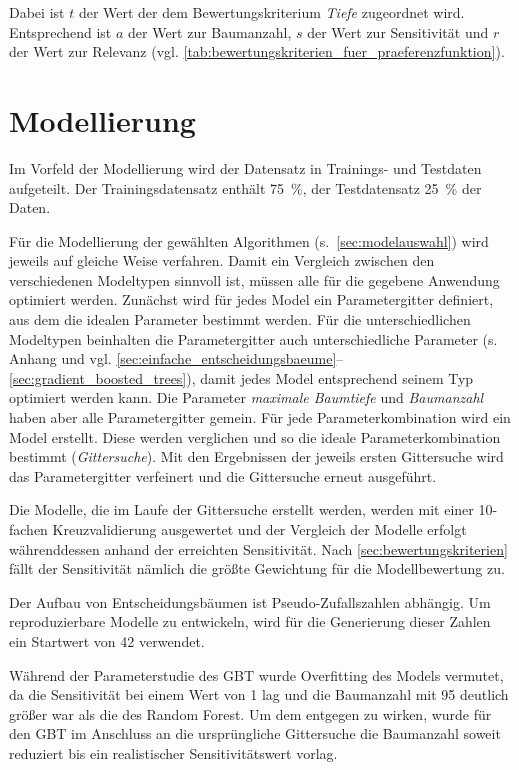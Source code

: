 Dabei ist $t$ der Wert der dem Bewertungskriterium \textit{Tiefe} zugeordnet wird. Entsprechend ist $a$ der Wert zur Baumanzahl, $s$ der Wert zur Sensitivität und $r$ der Wert zur Relevanz (vgl. \cref{tab:bewertungskriterien_fuer_praeferenzfunktion}).
\section{Modellierung}
\label{sec:modellierung}
Im Vorfeld der Modellierung wird der Datensatz in Trainings- und Testdaten aufgeteilt. Der Trainingsdatensatz enthält \SI{75}{\percent}, der Testdatensatz \SI{25}{\percent} der Daten. 

Für die Modellierung der gewählten Algorithmen (s.~\cref{sec:modelauswahl}) wird jeweils auf gleiche Weise verfahren. Damit ein Vergleich zwischen den verschiedenen Modeltypen sinnvoll ist, müssen alle für die gegebene Anwendung optimiert werden. Zunächst wird für jedes Model ein Parametergitter definiert, aus dem die idealen Parameter bestimmt werden. Für die unterschiedlichen Modeltypen beinhalten die Parametergitter auch unterschiedliche Parameter (s. Anhang und vgl. \cref{sec:einfache_entscheidungsbaeume}--\cref{sec:gradient_boosted_trees}), damit jedes Model entsprechend seinem Typ optimiert werden kann. Die Parameter \textit{maximale Baumtiefe} und \textit{Baumanzahl} haben aber alle Parametergitter gemein. Für jede Parameterkombination wird ein Model erstellt. Diese werden verglichen und so die ideale Parameterkombination bestimmt (\textit{Gittersuche}). Mit den Ergebnissen der jeweils ersten Gittersuche wird das Parametergitter verfeinert und die Gittersuche erneut ausgeführt.

Die Modelle, die im Laufe der Gittersuche erstellt werden, werden mit einer 10-fachen Kreuzvalidierung ausgewertet und der Vergleich der Modelle erfolgt währenddessen anhand der erreichten Sensitivität. Nach \cref{sec:bewertungskriterien} fällt der Sensitivität nämlich die größte Gewichtung für die Modellbewertung zu.

Der Aufbau von Entscheidungsbäumen ist Pseudo-Zufallszahlen abhängig. Um reproduzierbare Modelle zu entwickeln, wird für die Generierung dieser Zahlen ein Startwert von \num{42} verwendet.

Während der Parameterstudie des GBT wurde Overfitting des Models vermutet, da die Sensitivität bei einem Wert von \num{1} lag und die Baumanzahl mit \num{95} deutlich größer war als die des Random Forest. Um dem entgegen zu wirken, wurde für den GBT im Anschluss an die ursprüngliche Gittersuche die Baumanzahl soweit reduziert bis ein realistischer Sensitivitätswert vorlag.
